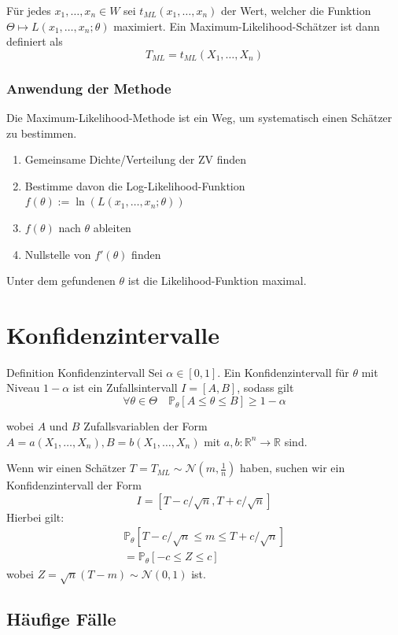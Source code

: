 \documentclass[a4paper,10pt]{article}
\def\R{\mathbb{R}}
\def\P{\mathbb{P}}
\begin{document}
\noindent Für jedes \(x_1, \ldots, x_n \in W\) sei \(t_{ML}(x_1, \ldots, x_n)\) der Wert, welcher die Funktion \(\Theta \mapsto L(x_1, \ldots, x_n; \theta)\) maximiert. Ein Maximum-Likelihood-Schätzer ist dann definiert als
\[T_{ML} = t_{ML}(X_1, \ldots, X_n)\]

\subsubsection{Anwendung der Methode}
Die Maximum-Likelihood-Methode ist ein Weg, um systematisch einen Schätzer zu bestimmen.
\begin{enumerate}
	\item Gemeinsame Dichte/Verteilung der ZV finden
	\item Bestimme davon die Log-Likelihood-Funktion\\ \(f(\theta) := \ln(L(x_1, \ldots, x_n;\theta))\)
	\item \(f(\theta)\) nach \(\theta\) ableiten
	\item Nullstelle von \(f'(\theta)\) finden
\end{enumerate}
Unter dem gefundenen \(\theta\) ist die Likelihood-Funktion maximal.

\section{Konfidenzintervalle}
\begin{mainbox}{Definition Konfidenzintervall}
	Sei \(\alpha \in [0,1]\). Ein Konfidenzintervall für \(\theta\) mit Niveau \(1 - \alpha\) ist ein Zufallsintervall \(I=[A,B]\), sodass gilt
	\[\forall \theta \in \Theta \quad \P_\theta[A\le \theta \le B] \ge 1- \alpha\]

	wobei \(A\) und \(B\) Zufallsvariablen der Form \(A = a(X_1, \ldots, X_n), B = b(X_1, \ldots, X_n)\) mit \(a,b: \R^n \to \R\) sind.
\end{mainbox}

Wenn wir einen Schätzer \(T = T_{ML} \sim \mathcal{N}(m, \frac{1}{n})\) haben, suchen wir ein Konfidenzintervall der Form
\[I = [T-c/\sqrt{n}, T+c/\sqrt{n}]\]
Hierbei gilt:
\begin{align*}
	\P_\theta[T-c/\sqrt{n} \le m \le T+c/\sqrt{n}] \\
	= \P_\theta[-c\le Z \le c]
\end{align*}
wobei \(Z = \sqrt{n}(T-m) \sim \mathcal{N}(0, 1)\) ist.

\subsection{Häufige Fälle}
\end{document}
